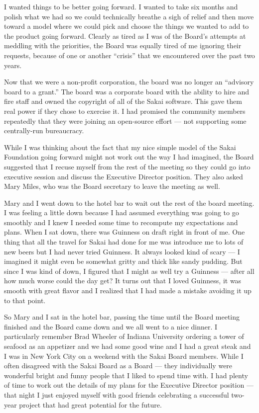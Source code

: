 \documentclass[12pt]{book}
\begin{document}
I wanted things to be better going forward.   I wanted to
take six months and polish what we had so we could
technically breathe a sigh of relief and then move toward
a model where we could pick and choose the things we
wanted to add to the product going forward.   Clearly as
tired as I was of the Board's attempts at meddling with
the priorities, the Board was equally tired of me ignoring
their requests, because of one or another ``crisis'' that
we encountered over the past two years.

Now that we were a non-profit corporation, the
board was no longer an ``advisory
board to a grant.''  The board was a corporate board with
the ability to hire and fire staff and owned the
copyright of all of the Sakai software.  This gave them
real power if they chose to exercise it.
I had promised the community
members repeatedly that they were joining an open-source
effort --- not supporting some centrally-run bureaucracy.

While I was thinking about the fact that my nice simple
model of the Sakai Foundation going forward might not
work out the way I had imagined, the Board
suggested that I recuse myself from the rest of the
meeting so they could go into executive
session and discuss the Executive Director position.
They also asked Mary Miles, who was the Board secretary
to leave the meeting as well.

Mary and I went down to the hotel bar to wait out the
rest of the board meeting.  I was feeling a little
down because I had assumed everything was going to
go smoothly and I knew I needed some time to recompute
my expectations and plans.   When I sat down, there
was Guinness on draft right in front of me.  One thing
that all the travel for Sakai had done for me was
introduce me to lots of new beers but I had never
tried Guinness.  It always looked kind of scary ---
I imagined it might even be somewhat gritty and thick
like sandy pudding.   But since I was kind of down, I
figured that I might as well try a Guinness --- after
all how much worse could the day get?   It turns
out that I loved Guinness, it was smooth with great
flavor and I realized that I had made a mistake
avoiding it up to that point.

So Mary and I sat in the hotel bar, passing the time
until the Board meeting finished and the Board came
down and we all went to a nice dinner.  I
particularly remember Brad Wheeler of Indiana
University ordering a tower of seafood
as an appetizer and we had some good wine and I
had a great steak and I was in New York City on a
weekend with the Sakai Board members.  While I
often disagreed with the Sakai Board as a Board ---
they individually were wonderful bright and funny
people that I liked to spend time with.   I
had plenty of time to work out the details of my
plans for the Executive Director position --- that
night I just enjoyed myself with good friends
celebrating a successful two-year project that
had great potential for the future.
\end{document}
